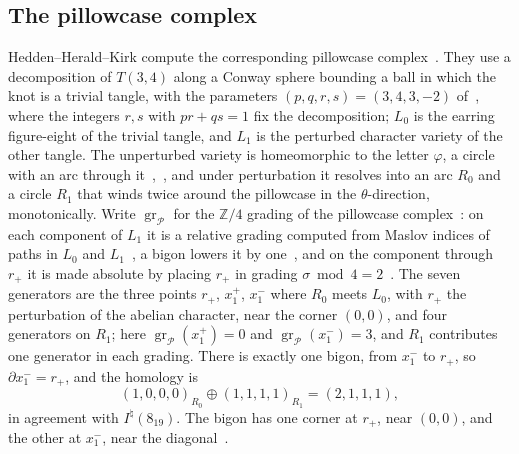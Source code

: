 \documentclass[11pt,reqno]{amsart}
\theoremstyle{plain}
\theoremstyle{definition}
\newcommand{\Z}{\mathbb{Z}}
\newcommand{\Inat}{I^{\natural}}
\newcommand{\gr}{\operatorname{gr}}
\newcommand{\pill}{\mathcal{P}}
\begin{document}
\subsection{The pillowcase complex}
Hedden--Herald--Kirk compute the corresponding pillowcase complex~\cite[\S11.6]{HHK2}. They use a
decomposition of $T(3,4)$ along a Conway sphere bounding a ball in which the knot is a trivial tangle,
with the parameters $(p,q,r,s)=(3,4,3,-2)$ of~\cite[\S10]{HHK2}, where the integers $r,s$ with $pr+qs=1$ fix the
decomposition; $L_0$ is the earring figure-eight of the trivial
tangle, and $L_1$ is the perturbed character variety of the other
tangle. The unperturbed variety is homeomorphic to the letter $\varphi$, a circle with an arc through
it~\cite[\S11.6]{HHK2},~\cite[Prop.~11.4]{HHK1}, and under perturbation it resolves into an arc $R_0$ and
a circle $R_1$ that winds twice around the pillowcase in the $\theta$-direction, monotonically. Write
$\gr_{\pill}$ for the $\Z/4$ grading of the pillowcase complex~\cite[Def.~3.7]{HHK2}: on each component of $L_1$ it
is a relative grading computed from Maslov indices of paths in $L_0$ and $L_1$~\cite[Lemma~3.10]{HHK2}, a bigon
lowers it by one~\cite[Prop.~3.8]{HHK2}, and on the component through $r_+$ it is made absolute by placing $r_+$
in grading $\sigma\bmod4=2$~\cite[(19), \S11.6]{HHK2}. The seven generators are the three points $r_+$, $x_1^+$, $x_1^-$ where $R_0$ meets
$L_0$, with $r_+$ the perturbation of the abelian character, near the corner $(0,0)$, and four generators
on $R_1$; here $\gr_{\pill}(x_1^+)=0$ and $\gr_{\pill}(x_1^-)=3$, and $R_1$ contributes one generator in each
grading. There is exactly one bigon, from $x_1^-$ to $r_+$, so $\partial x_1^-=r_+$, and the homology is
\[
(1,0,0,0)_{R_0}\oplus(1,1,1,1)_{R_1}=(2,1,1,1),
\]
in agreement with $\Inat(8_{19})$. The bigon has one corner at $r_+$, near $(0,0)$, and the other at
$x_1^-$, near the diagonal~\cite[Fig.~21]{HHK2}.
\end{document}
